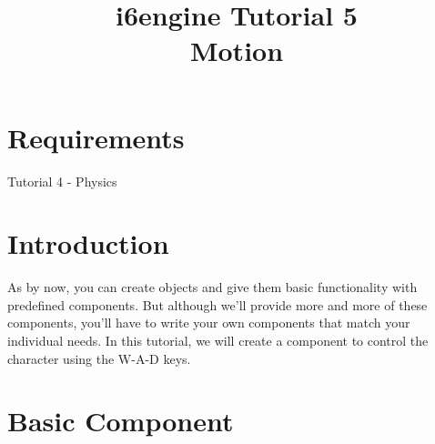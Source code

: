 \documentclass{article}
\title{i6engine Tutorial 5 \\ Motion}
\begin{document}
\section{Requirements}

Tutorial 4 - Physics

\section{Introduction}

As by now, you can create objects and give them basic functionality with predefined components. But although we'll provide more and more of these components, you'll have to write your own components that match your individual needs. In this tutorial, we will create a component to control the character using the W-A-D keys.

\section{Basic Component}
\end{document}
